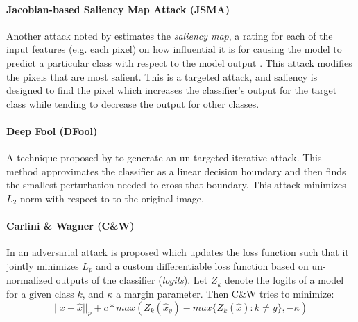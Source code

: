 \paragraph{Jacobian-based Saliency Map Attack (JSMA)} Another attack noted by  \cite{papernot_limitations_2015}
  estimates the \emph{saliency map}, a rating for each of the input features (e.g. each pixel) on how influential it is for causing the model to predict a particular class with respect to the model output \cite{wiyatno2018saliency}. This attack modifies the pixels that are most salient. This is a targeted attack, and saliency is designed to find the pixel which increases the classifier's output for the target class while tending to decrease the output for other classes.

\paragraph{Deep Fool (DFool)} A technique proposed by \cite{moosavi-dezfooli_deepfool:_2015}
  to generate an un-targeted iterative attack. 
This method approximates the classifier as a linear decision boundary and then finds the smallest perturbation needed to cross that boundary.
This attack minimizes $L_2$ norm with respect to  to the original image.

\paragraph{Carlini \& Wagner (C\&W)} In \cite{carlini_towards_2016}
  an adversarial attack is proposed which updates the loss function such that it jointly minimizes $L_p$ and a custom differentiable loss function based on un-normalized outputs of the classifier (\textit{logits}). 
Let $Z_k$ denote the logits of a model for a given class $k$, and $\kappa$ a margin parameter. Then C\&W tries to minimize:
\begin{equation}
|| x - \hat{x} ||_p + c* max\left(Z_k(\hat{x}_y) - max\{Z_k(\hat{x}) : k \neq y\},-\kappa\right)
\end{equation}

